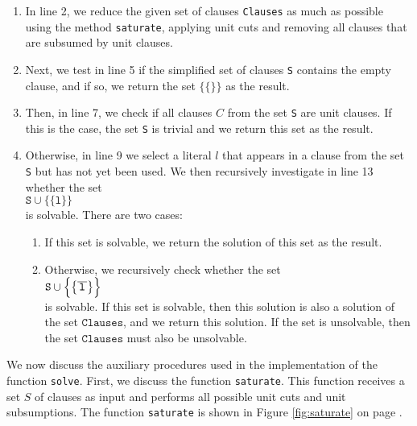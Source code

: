 \begin{enumerate}
\item In line 2, we reduce the given set of clauses \texttt{Clauses} as much as possible using the method \texttt{saturate},
      applying unit cuts and removing all clauses that are subsumed by unit clauses.
\item Next, we test in line 5 if the simplified set of clauses \texttt{S}
      contains the empty clause, and if so, we return the set 
      $\bigl\{\{\}\bigr\}$ as the result.
\item Then, in line 7, we check if all clauses $C$ from the set
      \texttt{S} are unit clauses. If this is the case,
      the set \texttt{S} is trivial and we return this set as the result.
\item Otherwise, in line 9 we select a literal $l$ that appears in a clause from the set \texttt{S} 
      but has not yet been used.
      We then recursively investigate in line 13 whether the set \\[0.2cm]
      \hspace*{1.3cm} 
      $\texttt{S} \cup \bigl\{\{\texttt{l}\}\bigr\}$ 
      \\[0.2cm]
      is solvable. There are two cases:
      \begin{enumerate}
      \item If this set is solvable, we return the solution of this set as the result.

      \item Otherwise, we recursively check whether the set 
            \\[0.2cm]
            \hspace*{1.3cm}
            $\texttt{S} \cup \Bigl\{ \bigl\{ \overline{\,\texttt{l}\,} \bigr\} \Bigr\}$ 
            \\[0.2cm]
            is solvable. If this set is solvable, then this solution is also a
            solution of the set $\texttt{Clauses}$, and we return this solution. If the
            set is unsolvable, then the set $\texttt{Clauses}$ must also be unsolvable.
      \end{enumerate}
\end{enumerate}

We now discuss the auxiliary procedures used in the implementation of the function
\texttt{solve}.
First, we discuss the function \texttt{saturate}. This function receives a
set $S$ of clauses as input and performs all possible unit cuts and
unit subsumptions.
The function \texttt{saturate} is shown in Figure \ref{fig:saturate} on page \pageref{fig:saturate}.

